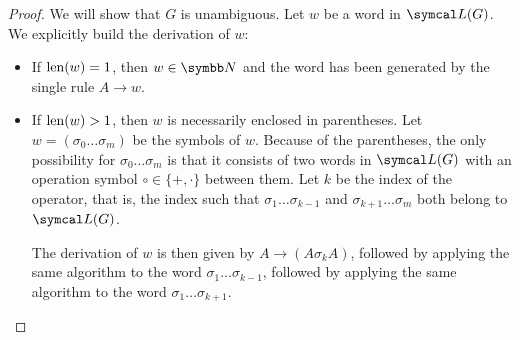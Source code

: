 \begin{proof}
  We will show that \( G \) is unambiguous. Let \( w \) be a word in \( \Cal{L}(G) \). We explicitly build the derivation of \( w \):
  \begin{itemize}
    \item If \( \operatorname{len}(w) = 1 \), then \( w \in \BB{N} \) and the word has been generated by the single rule \( A \to w \).
    \item If \( \operatorname{len}(w) > 1 \), then \( w \) is necessarily enclosed in parentheses. Let \( w = ( \sigma_0 \ldots \sigma_m ) \) be the symbols of \( w \). Because of the parentheses, the only possibility for \( \sigma_0 \ldots \sigma_m \) is that it consists of two words in \( \Cal{L}(G) \) with an operation symbol \( \circ \in \{ +, \cdot \} \) between them. Let \( k \) be the index of the operator, that is, the index such that \( \sigma_1 \ldots \sigma_{k-1} \) and \( \sigma_{k+1} \ldots \sigma_m \) both belong to \( \Cal{L}(G) \).

    The derivation of \( w \) is then given by \( A \to (A \sigma_k A) \), followed by applying the same algorithm to the word \( \sigma_1 \ldots \sigma_{k-1} \), followed by applying the same algorithm to the word \( \sigma_1 \ldots \sigma_{k+1} \).
  \end{itemize}
\end{proof}
